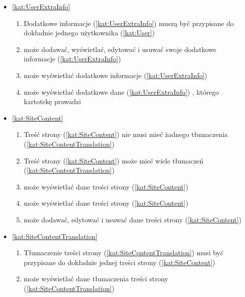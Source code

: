 \begin{itemize}[label={\textbf{Reguły dla}}, wide, labelwidth=!, labelindent=0pt]
    \item\ref{kat:UserExtraInfo}
    \begin{enumerate}[label={\textbf{REG/\protect\threedigits{\arabic{enumi}}}}, wide, labelwidth=!, align=left, leftmargin=3cm, resume]
        \item Dodatkowe informacje (\ref{kat:UserExtraInfo}) muszą być przypisane do dokładnie jednego użytkownika (\ref{kat:User})
        \item {} może dodawać, wyświetlać, edytować i usuwać swoje dodatkowe informacje (\ref{kat:UserExtraInfo})
        \item {} może wyświetlać dodatkowe informacje (\ref{kat:UserExtraInfo}) 
        \item {} może wyświetlać dodatkowe dane (\ref{kat:UserExtraInfo}) , którego kartotekę prowadzi
    \end{enumerate}
    \item\ref{kat:SiteContent}
    \begin{enumerate}[label={\textbf{REG/\protect\threedigits{\arabic{enumi}}}}, wide, labelwidth=!, align=left, leftmargin=3cm, resume]
        \item Treść strony (\ref{kat:SiteContent}) nie musi mieć żadnego tłumaczenia (\ref{kat:SiteContentTranslation})
        \item Treść strony (\ref{kat:SiteContent}) może mieć wiele tłumaczeń (\ref{kat:SiteContentTranslation})
        \item {} może wyświetlać dane treści strony (\ref{kat:SiteContent})
        \item {} może wyświetlać dane treści strony (\ref{kat:SiteContent})
        \item {} może dodawać, edytować i usuwać dane treści strony (\ref{kat:SiteContent})
    \end{enumerate}
    \item\ref{kat:SiteContentTranslation}
    \begin{enumerate}[label={\textbf{REG/\protect\threedigits{\arabic{enumi}}}}, wide, labelwidth=!, align=left, leftmargin=3cm, resume]
        \item Tłumaczenie treści strony (\ref{kat:SiteContentTranslation}) musi być przypisane do dokładnie jednej treści strony (\ref{kat:SiteContent})
        \item {} może wyświetlać dane tłumaczenia treści strony (\ref{kat:SiteContentTranslation})

\end{enumerate}
\end{itemize}
